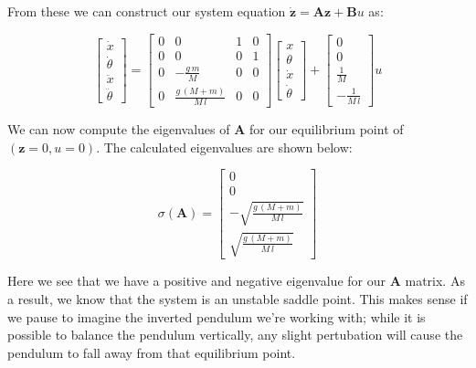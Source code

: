 \documentclass{article}
\begin{document}
From these we can construct our system equation $\dot{\boldsymbol{z}}=\boldsymbol{A}\boldsymbol{z}+\boldsymbol{B}u$ as:

\begin{equation}
    \begin{bmatrix}
        \dot{x} \\ \dot{\theta} \\ \ddot{x} \\ \ddot{\theta}
    \end{bmatrix}
    =
    \begin{bmatrix}
        0 & 0 & 1 & 0\\
        0 & 0 & 0 & 1\\[4pt]
        0 & -\frac{g\,m}{M} & 0 & 0\\[4pt]
        0 & \frac{g\,{\left(M+m\right)}}{M\,l} & 0 & 0
    \end{bmatrix}
    \begin{bmatrix}
        x \\ \theta \\ \dot{x} \\ \dot{\theta}
    \end{bmatrix}
    +
    \begin{bmatrix}
        0\\
        0\\[4pt]
        \frac{1}{M}\\[4pt]
        -\frac{1}{M\,l}
    \end{bmatrix}
    u
\end{equation}

We can now compute the eigenvalues of $\boldsymbol{A}$ for our equilibrium point of $(\boldsymbol{z}=0, u=0)$. The calculated eigenvalues are shown below:

\begin{equation}
    \sigma(\boldsymbol{A}) =
    \begin{bmatrix}
        0\\
        0\\[4pt]
        -\sqrt{\frac{g\,{\left(M+m\right)}}{M\,l}}\\[4pt]
        \sqrt{\frac{g\,{\left(M+m\right)}}{M\,l}}
    \end{bmatrix}
\end{equation}

Here we see that we have a positive and negative eigenvalue for our $\boldsymbol{A}$ matrix. As a result, we know that the system is an unstable saddle point. This makes sense if we pause to imagine the inverted pendulum we're working with; while it is possible to balance the pendulum vertically, any slight pertubation will cause the pendulum to fall away from that equilibrium point.
\end{document}
